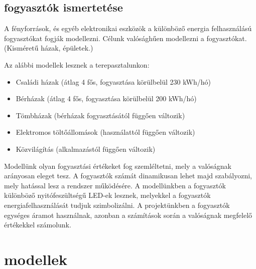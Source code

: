 \documentclass[
]{thesis-ekf}
\theoremstyle{definition}
\theoremstyle{remark}
\begin{document}
		\subsection{fogyasztók ismertetése}
		\par A fényforrások, és egyéb elektronikai eszközök a különböző energia felhasználású fogyasztókat fogják modellezni. Célunk valósághűen modellezni a fogyasztókat. (Kisméretű házak, épületek.) 
		\par Az alábbi modellek lesznek a terepasztalunkon:
		\begin{itemize}
			\item Családi házak (átlag 4 fős, fogyasztása körülbelül 230 kWh/hó)
			\item Bérházak (átlag 4 fős, fogyasztása körülbelül 200 kWh/hó)
			\item Tömbházak (bérházak fogyasztásától függően változik)
			\item Elektromos töltőállomások (használattól függően változik)
			\item Közvilágítás (alkalmazástól függően változik)
		\end{itemize}
	
		Modellünk olyan fogyasztási értékeket fog szemléltetni, mely a valóságnak arányosan eleget tesz. A fogyasztók számát dinamikusan lehet majd szabályozni, mely hatással lesz a rendszer működésére. A modellünkben a fogyasztók különböző nyitófeszültségű LED-ek lesznek, melyekkel a fogyasztók energiafelhasználását tudjuk szimbolizálni. A projektünkben a fogyasztók egységes áramot használnak, azonban a számítások során a valóságnak megfelelő értékekkel számolunk.
		
	\section{modellek}
	
\end{document}
